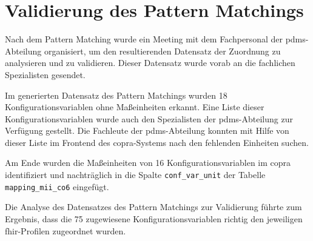 \section{Validierung des Pattern Matchings } \label{sec:validmethode}

Nach dem Pattern Matching wurde ein Meeting mit dem Fachpersonal der \ac{pdms}-Abteilung organisiert, um den resultierenden Datensatz der Zuordnung zu analysieren und zu validieren. Dieser Datensatz wurde vorab an die fachlichen Spezialisten gesendet.

Im generierten Datensatz des Pattern Matchings wurden 18 Konfigurationsvariablen ohne Maßeinheiten erkannt. Eine Liste dieser Konfigurationsvariablen wurde auch den Spezialisten der \ac{pdms}-Abteilung zur Verfügung gestellt. Die Fachleute der \ac{pdms}-Abteilung konnten mit Hilfe von dieser Liste im Frontend des \ac{copra}-Systems nach den fehlenden Einheiten suchen.

Am Ende wurden die Maßeinheiten von 16 Konfigurationsvariablen im \ac{copra} identifiziert und nachträglich in die Spalte \texttt{conf\_var\_unit} der Tabelle \texttt{mapping\_mii\_co6} eingefügt.

Die Analyse des Datensatzes des Pattern Matchings zur Validierung führte zum Ergebnis, dass die 75 zugewiesene Konfigurationsvariablen richtig den jeweiligen \ac{fhir}-Profilen zugeordnet wurden.